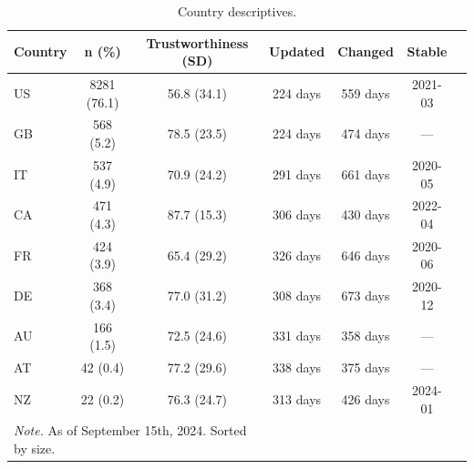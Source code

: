 \begin{table}[H]
\caption{Country descriptives.}
\label{table:countries}
\begin{tabularx}{\textwidth}{X c c c c c c}
\toprule
Country & n (\%) & Trustworthiness (SD) & Updated & Changed & Stable \\
\midrule
US & 8281 (76.1) & 56.8 (34.1) & 224 days & 559 days & 2021-03 \\
GB & 568 (5.2) & 78.5 (23.5) & 224 days & 474 days & --- \\
IT & 537 (4.9) & 70.9 (24.2) & 291 days & 661 days & 2020-05 \\
CA & 471 (4.3) & 87.7 (15.3) & 306 days & 430 days & 2022-04 \\
FR & 424 (3.9) & 65.4 (29.2) & 326 days & 646 days & 2020-06 \\
DE & 368 (3.4) & 77.0 (31.2) & 308 days & 673 days & 2020-12 \\
AU & 166 (1.5) & 72.5 (24.6) & 331 days & 358 days & --- \\
AT & 42 (0.4) & 77.2 (29.6) & 338 days & 375 days & --- \\
NZ & 22 (0.2) & 76.3 (24.7) & 313 days & 426 days & 2024-01 \\
\bottomrule
\multicolumn{3}{l}{\textit{Note.} As of September 15th, 2024. Sorted by size.}
\end{tabularx}
\end{table}
